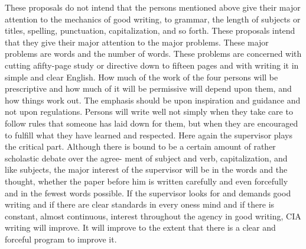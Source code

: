 \documentclass[
    oneside,
    11pt,
    draft
]{memoir}
\begin{document}
These proposals do not intend that the persons mentioned above give their major attention to the mechanics of good writing, to grammar, the length of subjects or titles, spelling, punctuation, capitalization, and so forth. These proposals intend that they give their major attention to the major problems. These major problems are words and the number of words. These problems are concerned with cutting afifty-page study or directive down to fifteen pages and with writing it in simple and clear English. How much of the work of the four persons will be prescriptive and how much of it will be permissive will depend upon them, and how things work out. The emphasis should be upon inspiration and guidance and not upon regulations. Persons will write well not simply when they take care to follow rules that someone has laid down for them, but when they are encouraged to fulfill what they have learned and respected. Here again the supervisor plays the critical part. Although there is bound to be a certain amount of rather scholastic debate over the agree- ment of subject and verb, capitalization, and like subjects, the major interest of the supervisor will be in the words and the thought, whether the paper before him is written carefully and even forcefully and in the fewest words possible. If the supervisor looks for and demands good writing and if there are clear standards in every oness mind and if there is constant, almost continuous, interest throughout the agency in good writing, CIA writing will improve. It will improve to the extent that there is a clear and forceful program to improve it.
\backmatter{}
\newpage
\
\end{document}
